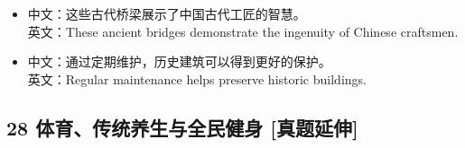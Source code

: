 \documentclass[a4paper,11pt,UTF8,fontset=none]{ctexart}
\begin{document}
\par

\begin{itemize}[leftmargin=1.7em,itemsep=1pt,parsep=0pt,topsep=2pt]
\item \noindent 中文：这些古代桥梁展示了中国古代工匠的智慧。\\ 英文：These ancient bridges demonstrate the ingenuity of Chinese craftsmen.\par


\item \noindent 中文：通过定期维护，历史建筑可以得到更好的保护。\\ 英文：Regular maintenance helps preserve historic buildings.\par


\end{itemize}

\subsection{28 体育、传统养生与全民健身 {\color{AccentBlue} [真题延伸]}}
\end{document}
